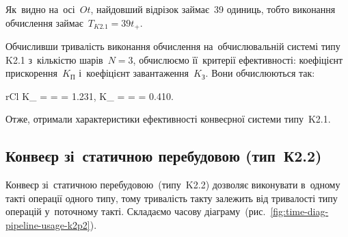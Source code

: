 \documentclass[
	a4paper,
	oneside,
	BCOR = 10mm,
	DIV = 12,
	12pt,
	headings = normal,
]{scrartcl}
\begin{document}
				Як~видно на~осі~$Ot$, найдовший відрізок займає~39 одиниць, тобто виконання обчислення займає~$T_{K2.1} = 39t_{+}$.

				Обчисливши тривалість виконання обчислення на~обчислювальній системі типу K2.1 з~кількістю шарів~$N = 3$, обчислюємо її~критерії ефективності: коефіцієнт прискорення~$K_{\text{П}}$ і~коефіцієнт завантаження~$K_{\text{З}}$. Вони обчислюються так:
				\begin{IEEEeqnarray*}{rCl}
					K_{} =  =  = \num{1.231}, \quad
					K_{} =  =  = \num{0.410}.
				\end{IEEEeqnarray*}
				Отже, отримали характеристики ефективності конвеєрної системи типу~K2.1.

			\subsection{Конвеєр зі~статичною перебудовою (тип~К2.2)}
				Конвеєр зі~статичною перебудовою~(типу~K2.2) дозволяє виконувати в~одному такті операції одного типу, тому тривалість такту залежить від тривалості типу операцій у~поточному такті. Складаємо часову діаграму~(рис.~\ref{fig:time-diag-pipeline-usage-k2p2}).
\end{document}
